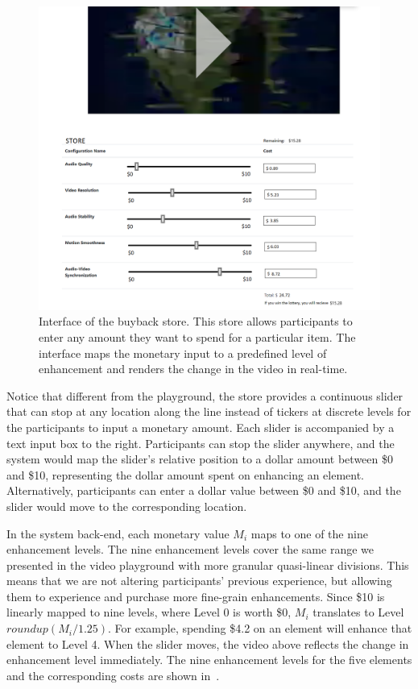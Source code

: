\begin{figure}[htpb]
    \centering
    \includegraphics[width=\textwidth, keepaspectratio=true]{content/image/bb_store.png}
    \caption{
        Interface of the buyback store. This store allows participants to enter any amount they want to spend for a particular item. The interface maps the monetary input to a predefined level of enhancement and renders the change in the video in real-time.
    }
    \label{fig:exp2_store}
\end{figure}

Notice that different from the playground, the store provides a continuous slider that can stop at any location along the line instead of tickers at discrete levels for the participants to input a monetary amount. Each slider is accompanied by a text input box to the right. Participants can stop the slider anywhere, and the system would map the slider's relative position to a dollar amount between \$0 and \$10, representing the dollar amount spent on enhancing an element. Alternatively, participants can enter a dollar value between \$0 and \$10, and the slider would move to the corresponding location.

In the system back-end, each monetary value $M_i$ maps to one of the nine enhancement levels. The nine enhancement levels cover the same range we presented in the video playground with more granular quasi-linear divisions. This means that we are not altering participants' previous experience, but allowing them to experience and purchase more fine-grain enhancements. Since \$10 is linearly mapped to nine levels, where Level 0 is worth \$0, $M_i$ translates to Level $roundup(M_i/1.25)$. For example, spending \$4.2 on an element will enhance that element to Level 4. When the slider moves, the video above reflects the change in enhancement level immediately. The nine enhancement levels for the five elements and the corresponding costs are shown in~.

